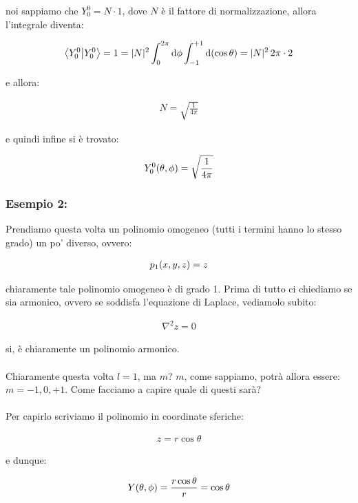 	noi sappiamo che $Y_0^0 = N \cdot 1$, dove $N$ è il fattore di normalizzazione, allora l'integrale diventa:
	
\begin{align*}
	\braket{Y_0^0}= 1 = |N|^2 \int_0^{2\pi} \dd \phi \int_{-1}^{+1} \dd (\cos\theta) = |N|^2 \, 2\pi \cdot 2
\end{align*}
	
	e allora:
	
\begin{align*}
	N = \sqrt{\frac{1}{4\pi}}
\end{align*}

	e quindi infine si è trovato:
	
\begin{align*}
	Y_0^0 \qty(\theta, \phi) = \sqrt{\frac{1}{4\pi}}
\end{align*}

\subsubsection{Esempio 2:}

	Prendiamo questa volta un polinomio omogeneo (tutti i termini hanno lo stesso grado) un po' diverso, ovvero:
	
\begin{align*}
	p_1\qty(x, y, z) = z
\end{align*}
	
	chiaramente tale polinomio omogeneo è di grado 1. Prima di tutto ci chiediamo se sia armonico, ovvero se soddisfa l'equazione di Laplace, vediamolo subito:
	
\begin{align*}
	\nabla^2 z = 0
\end{align*}

	si, è chiaramente un polinomio armonico.
	\\
	\\
	Chiaramente questa volta $l = 1$, ma $m$? $m$, come sappiamo, potrà allora essere: $m = -1, 0, +1$. Come facciamo a capire quale di questi sarà?
	\\
	\\
	Per capirlo scriviamo il polinomio in coordinate sferiche:
	
\begin{align*}
	z = r \cos\theta
\end{align*}

	e dunque:
	
\begin{align*}
	Y\qty(\theta, \phi) = \frac{r\cos\theta}{r} = \cos\theta
\end{align*}

